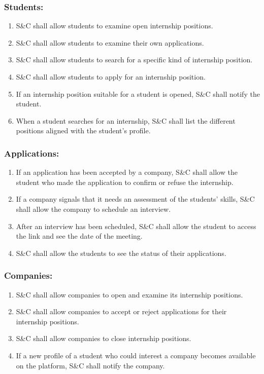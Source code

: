     \subsubsection*{Students:}
        \begin{enumerate}[label=\textbf{R\arabic*},resume]
            \item S\&C shall allow students to examine open internship positions. %
            \item S\&C shall allow students to examine their own applications.
            \item S\&C shall allow students to search for a specific kind of internship position.  
            \item S\&C shall allow students to apply for an internship position.
            \item If an internship position suitable for a student is opened, S\&C shall notify the student.
            \item When a student searches for an internship, S\&C shall list the different positions aligned with the student's profile.         
        \end{enumerate}
    
    \subsubsection*{Applications:}
        \begin{enumerate}[label=\textbf{R\arabic*},resume]
            \item If an application has been accepted by a company, S\&C shall allow the student who made the application to confirm or refuse the internship.
            \item If a company signals that it needs an assessment of the students' skills, S\&C shall allow the company to schedule an interview.
            \item After an interview has been scheduled, S\&C shall allow the student to access the link and see the date of the meeting.
            \item S\&C shall allow the students to see the status of their applications.
        \end{enumerate}
    
    \subsubsection*{Companies:}
        \begin{enumerate}[label=\textbf{R\arabic*},resume]
            \item S\&C shall allow companies to open and examine its internship positions.
            \item S\&C shall allow companies to accept or reject applications for their internship positions.
            \item S\&C shall allow companies to close internship positions.
            \item If a new profile of a student who could interest a company becomes available on the platform, S\&C shall notify the company.
        \end{enumerate}
    
